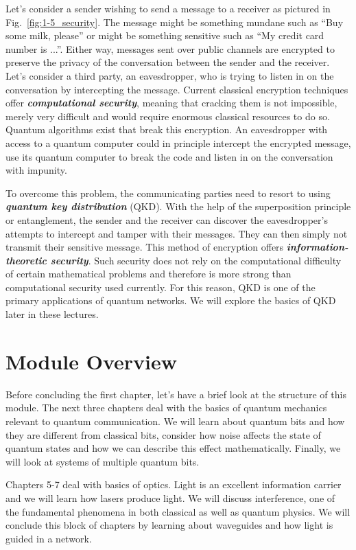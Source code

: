 Let's consider a sender wishing to send a message to a receiver as pictured in Fig.~\ref{fig:1-5_security}.
The message might be something mundane such as ``Buy some milk, please'' or might be something sensitive such as ``My credit card number is ...''.
Either way, messages sent over public channels are encrypted to preserve the privacy of the conversation between the sender and the receiver.
Let's consider a third party, an eavesdropper, who is trying to listen in on the conversation by intercepting the message.
Current classical encryption techniques offer \textit{\textbf{computational security}}, meaning that cracking them is not impossible, merely very difficult and would require enormous classical resources to do so.
Quantum algorithms exist that break this encryption.
An eavesdropper with access to a quantum computer could in principle intercept the encrypted message, use its quantum computer to break the code and listen in on the conversation with impunity.

To overcome this problem, the communicating parties need to resort to using \textit{\textbf{quantum key distribution}} (QKD).
With the help of the superposition principle or entanglement, the sender and the receiver can discover the eavesdropper's attempts to intercept and tamper with their messages.
They can then simply not transmit their sensitive message.
This method of encryption offers \textit{\textbf{information-theoretic security}}.
Such security does not rely on the computational difficulty of certain mathematical problems and therefore is more strong than computational security used currently.
For this reason, QKD is one of the primary applications of quantum networks.
We will explore the basics of QKD later in these lectures.

\section{Module Overview}
\label{sec:mod-over}

Before concluding the first chapter, let's have a brief look at the structure of this module.
The next three chapters deal with the basics of quantum mechanics relevant to quantum communication.
We will learn about quantum bits and how they are different from classical bits, consider how noise affects the state of quantum states and how we can describe this effect mathematically.
Finally, we will look at systems of multiple quantum bits.

Chapters 5-7 deal with basics of optics.
Light is an excellent information carrier and we will learn how lasers produce light.
We will discuss interference, one of the fundamental phenomena in both classical as well as quantum physics.
We will conclude this block of chapters by learning about waveguides and how light is guided in a network.

